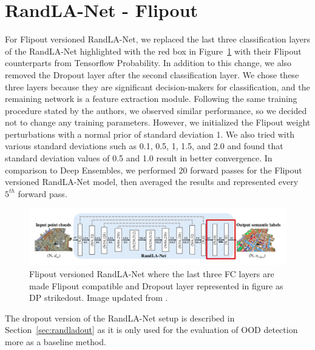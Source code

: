     \section{RandLA-Net - Flipout}
    \label{sec:flipout_setup}
    For Flipout versioned RandLA-Net, we replaced the last three classification layers of the RandLA-Net highlighted with the red box in Figure~\ref{fig:fout_randlanet} with their Flipout counterparts from Tensorflow Probability.
    In addition to this change, we also removed the Dropout layer after the second classification layer.
    We chose these three layers because they are significant decision-makers for classification, and the remaining network is a feature extraction module.
    Following the same training procedure stated by the authors, we observed similar performance, so we decided not to change any training parameters.
    However, we initialized the Flipout weight perturbations with a normal prior of standard deviation 1.
    We also tried with various standard deviations such as 0.1, 0.5, 1, 1.5, and 2.0 and found that standard deviation values of 0.5 and 1.0 result in better convergence.
    In comparison to Deep Ensembles, we performed 20 forward passes for the Flipout versioned RandLA-Net model, then averaged the results and represented every $5^{th}$ forward pass.
    \begin{figure}
        \centering
        \includegraphics[scale=0.42]{images/fout_randlanet.png}
        \caption{Flipout versioned RandLA-Net where the last three FC layers are made Flipout compatible and Dropout layer represented in figure as DP strikedout. Image updated from \cite{Hu_2020_CVPR_Randla}.}
        \label{fig:fout_randlanet}
    \end{figure}
    The dropout version of the RandLA-Net setup is described in Section~\ref{sec:randladout} as it is only used for the evaluation of OOD detection more as a baseline method.

